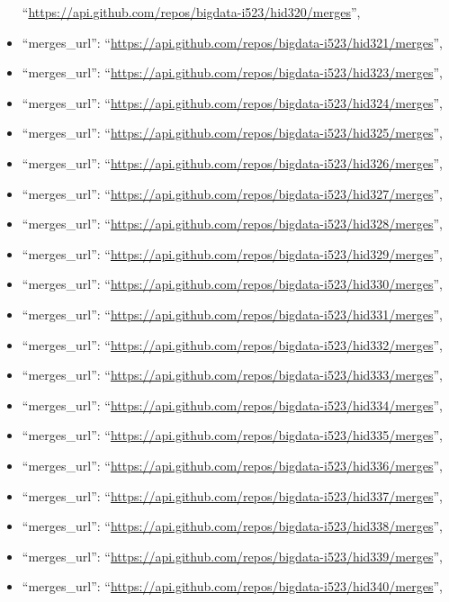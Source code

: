\begin{itemize}
  ``\url{https://api.github.com/repos/bigdata-i523/hid320/merges}'',
\item
  ``merges\_url'':
  ``\url{https://api.github.com/repos/bigdata-i523/hid321/merges}'',
\item
  ``merges\_url'':
  ``\url{https://api.github.com/repos/bigdata-i523/hid323/merges}'',
\item
  ``merges\_url'':
  ``\url{https://api.github.com/repos/bigdata-i523/hid324/merges}'',
\item
  ``merges\_url'':
  ``\url{https://api.github.com/repos/bigdata-i523/hid325/merges}'',
\item
  ``merges\_url'':
  ``\url{https://api.github.com/repos/bigdata-i523/hid326/merges}'',
\item
  ``merges\_url'':
  ``\url{https://api.github.com/repos/bigdata-i523/hid327/merges}'',
\item
  ``merges\_url'':
  ``\url{https://api.github.com/repos/bigdata-i523/hid328/merges}'',
\item
  ``merges\_url'':
  ``\url{https://api.github.com/repos/bigdata-i523/hid329/merges}'',
\item
  ``merges\_url'':
  ``\url{https://api.github.com/repos/bigdata-i523/hid330/merges}'',
\item
  ``merges\_url'':
  ``\url{https://api.github.com/repos/bigdata-i523/hid331/merges}'',
\item
  ``merges\_url'':
  ``\url{https://api.github.com/repos/bigdata-i523/hid332/merges}'',
\item
  ``merges\_url'':
  ``\url{https://api.github.com/repos/bigdata-i523/hid333/merges}'',
\item
  ``merges\_url'':
  ``\url{https://api.github.com/repos/bigdata-i523/hid334/merges}'',
\item
  ``merges\_url'':
  ``\url{https://api.github.com/repos/bigdata-i523/hid335/merges}'',
\item
  ``merges\_url'':
  ``\url{https://api.github.com/repos/bigdata-i523/hid336/merges}'',
\item
  ``merges\_url'':
  ``\url{https://api.github.com/repos/bigdata-i523/hid337/merges}'',
\item
  ``merges\_url'':
  ``\url{https://api.github.com/repos/bigdata-i523/hid338/merges}'',
\item
  ``merges\_url'':
  ``\url{https://api.github.com/repos/bigdata-i523/hid339/merges}'',
\item
  ``merges\_url'':
  ``\url{https://api.github.com/repos/bigdata-i523/hid340/merges}'',

\end{itemize}
